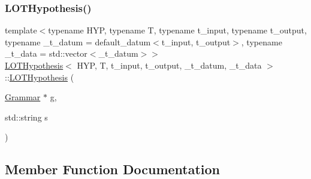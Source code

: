 \mbox{\label{class_l_o_t_hypothesis_a09216df69fea175ccb5ffc1a947b8287}} 
\subsubsection{\texorpdfstring{L\+O\+T\+Hypothesis()}{LOTHypothesis()}\hspace{0.1cm}{\footnotesize\ttfamily [4/4]}}
{\footnotesize\ttfamily template$<$typename H\+YP, typename T, typename t\+\_\+input, typename t\+\_\+output, typename \+\_\+t\+\_\+datum = default\+\_\+datum$<$t\+\_\+input, t\+\_\+output$>$, typename \+\_\+t\+\_\+data = std\+::vector$<$\+\_\+t\+\_\+datum$>$$>$ \\
\hyperlink{class_l_o_t_hypothesis}{L\+O\+T\+Hypothesis}$<$ H\+YP, T, t\+\_\+input, t\+\_\+output, \+\_\+t\+\_\+datum, \+\_\+t\+\_\+data $>$\+::\hyperlink{class_l_o_t_hypothesis}{L\+O\+T\+Hypothesis} (\begin{DoxyParamCaption}\item[{\hyperlink{class_grammar}{Grammar} $\ast$}]{g,  }\item[{std\+::string}]{s }\end{DoxyParamCaption})\hspace{0.3cm}{\ttfamily [inline]}}



\subsection{Member Function Documentation}
\mbox{\label{class_l_o_t_hypothesis_a592d67c976a67982251239b415e0a861}} 
